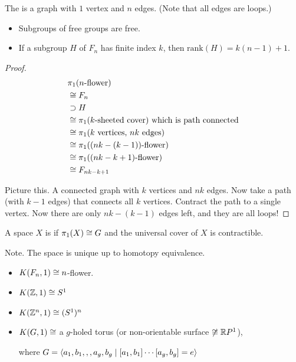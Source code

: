 \documentclass[11pt,leqno,oneside]{amsart}
\numberwithin{thm}{section}
\newcommand{\fund}[1][1]{\pi_{#1}}
\begin{document}
\begin{defn}
  The  is a graph with $1$ vertex and $n$ edges.  (Note that all edges are loops.)
\end{defn}
\begin{thm}
  \mbox{}
  \begin{itemize}
    \item Subgroups of free groups are free.
    \item If a subgroup $H$ of $F_n$ has finite index $k$, then $\text{rank}(H) = k(n-1)+1$.
  \end{itemize}
\end{thm}
\begin{proof}
  \begin{align}
    &\fund(n\text{-flower}) \\
    &\isom F_n \\
    & \supset H \\
    &\isom \fund(\text{$k$-sheeted cover}) ~\text{which is path connected}\\
    &\isom \fund(\text{$k$ vertices, $nk$ edges}) \\
    &\isom \fund(\text{$(nk - (k - 1))$-flower}) \\
    &\isom \fund(\text{$(nk-k+1)$-flower}) \\
    &\isom F_{nk - k + 1}
  \end{align}

  Picture this.  A connected graph with $k$ vertices and $nk$ edges.  Now take a path (with $k-1$ edges) that connects all $k$ vertices.  Contract the path to a single vertex.  Now there are only $nk - (k-1)$ edges left, and they are all loops!
\end{proof}

\begin{defn}
  A space $X$ is  if $\fund(X) \isom G$ and the universal cover of $X$ is contractible.
\end{defn}
Note.  The space is unique up to homotopy equivalence.
\begin{example}
  \mbox{}
  \begin{itemize}
    \item
    $K(F_n, 1) \mathrel{\cong} n$-flower.

    \item
    $K({\mathbb Z}, 1) \mathrel{\cong} S^1$

    \item
    $K({\mathbb Z}^n, 1) \mathrel{\cong} (S^1)^n$

    \item
    $K(G, 1) \mathrel{\cong}$ a $g$-holed torus (or non-orientable surface $\not\mathrel{\cong} {\mathbb R} P^1$),

    where $G = \langle a_1,b_1,,,a_g,b_g \mid [a_1,b_1]\cdots[a_g,b_g] = e \rangle$
  \end{itemize}
\end{example}
\end{document}

